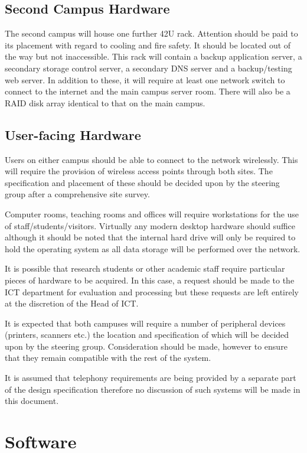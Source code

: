 \documentclass[a4paper, twoside]{article}
\begin{document}
\subsection{Second Campus Hardware}
The second campus will house one further 42U rack. Attention should be paid to
its placement with regard to cooling and fire safety. It should be located out
of the way but not inaccessible. This rack will contain a backup application
server, a secondary storage control server, a secondary DNS server and a
backup/testing web server. In addition to these, it will require at least one
network switch to connect to the internet and the main campus server room. There
will also be a RAID disk array identical to that on the main campus.

\subsection{User-facing Hardware}
Users on either campus should be able to connect to the network wirelessly. This
will require the provision of wireless access points through both sites. The
specification and placement of these should be decided upon by the steering
group after a comprehensive site survey.

Computer rooms, teaching rooms and offices will require workstations for the use
of staff/students/visitors. Virtually any modern desktop hardware should suffice
although it should be noted that the internal hard drive will only be required
to hold the operating system as all data storage will be performed over the
network.

It is possible that research students or other academic staff require particular
pieces of hardware to be acquired. In this case, a request should be made to the
ICT department for evaluation and processing but these requests are left
entirely at the discretion of the Head of ICT.

It is expected that both campuses will require a number of peripheral devices
(printers, scanners etc.) the location and specification of which will be
decided upon by the steering group. Consideration should be made, however to
ensure that they remain compatible with the rest of the system.

It is assumed that telephony requirements are being provided by a separate part
of the design specification therefore no discussion of such systems will be made
in this document.

\section{Software}
\end{document}
